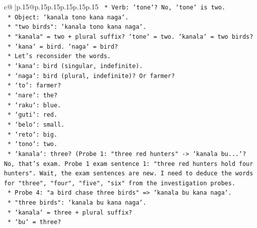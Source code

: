 \documentclass{article}
\begin{document}
{\begin{supertabular}{c@{$\;$}|p{.15\linewidth}@{}p{.15\linewidth}p{.15\linewidth}p{.15\linewidth}p{.15\linewidth}p{.15\linewidth}}
{{{\texttt{                                *   Verb: `tone`? No, `tone` is two.} \\
\texttt{                                *   Object: `kanala tono kana naga`.} \\
\texttt{                                *   "two birds": `kanala tono kana naga`.} \\
\texttt{                                *   "kanala" = two + plural suffix? `tone` = two. `kanala` = two birds?} \\
\texttt{                                *   `kana` = bird. `naga` = bird?} \\
\texttt{                            *   Let's reconsider the words.} \\
\texttt{                                *   `kana`: bird (singular, indefinite).} \\
\texttt{                                *   `naga`: bird (plural, indefinite)? Or farmer?} \\
\texttt{                                *   `to`: farmer?} \\
\texttt{                                *   `nare`: the?} \\
\texttt{                                *   `raku`: blue.} \\
\texttt{                                *   `guti`: red.} \\
\texttt{                                *   `belo`: small.} \\
\texttt{                                *   `reto`: big.} \\
\texttt{                                *   `tono`: two.} \\
\texttt{                                *   `kanala`: three? (Probe 1: "three red hunters" {-}> `kanala bu...`? No, that's exam. Probe 1 exam sentence 1: "three red hunters hold four hunters". Wait, the exam sentences are new. I need to deduce the words for "three", "four", "five", "six" from the investigation probes.} \\
\texttt{                                *   Probe 4: "a bird chase three birds" => `kanala bu kana naga`.} \\
\texttt{                                    *   "three birds": `kanala bu kana naga`.} \\
\texttt{                                    *   `kanala` = three + plural suffix?} \\
\texttt{                                    *   `bu` = three?} \\
}}}
\end{supertabular}}
\end{document}
